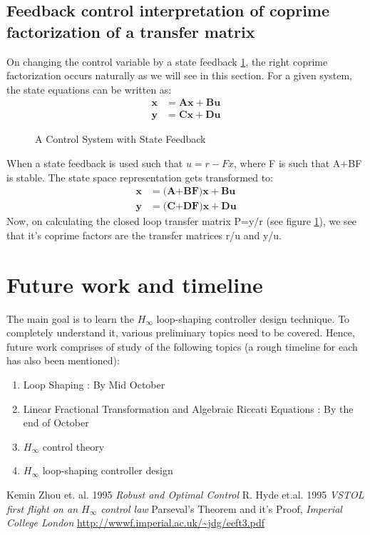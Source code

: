 \documentclass[a4paper,12pt]{article}
\begin{document}
		\subsection{Feedback control interpretation of coprime factorization of a transfer matrix}On changing the control variable by a state feedback \ref{sf}, the right coprime factorization occurs naturally as we will see in this section. For a given system, the state equations can be written as:
		\begin{align}
		\textbf{\.x}&=\textbf{Ax} + \textbf{Bu}\\
		\textbf{y}&=\textbf{Cx} + \textbf{Du}
		\end{align}
		\begin{figure}[H]
 
			  \centering
			  
%			  
			  \def\svgscale{1.8}
			  \tiny{
			  
			  }
			  \caption{A Control System with State Feedback}
			 \label{sf}
		\end{figure}
		When a state feedback is used such that $u=r-Fx$, where F is such that A+BF is stable. The state space representation gets transformed to:
		\begin{align}
		\textbf{\.x}&=\textbf{(A+BF)x} + \textbf{Bu}\\
		\textbf{y}&=\textbf{(C+DF)x} + \textbf{Du}
		\end{align}		
		Now, on calculating the closed loop transfer matrix P=y/r (see figure \ref{sf}), we see that it's coprime factors are the transfer matrices r/u and y/u.
		\section{Future work and timeline}
	The main goal is to learn the $H_{\infty}$ loop-shaping controller design technique. To completely understand it, various preliminary topics need to be covered. Hence, future work comprises of study of the following topics (a rough timeline for each has also been mentioned):
		\begin{enumerate}
			\item Loop Shaping : By Mid October
			\item Linear Fractional Transformation and Algebraic Riccati Equations : By the end of October
			\item $H_{\infty}$ control theory
			\item $H_{\infty}$ loop-shaping controller design 
		\end{enumerate}
\begin{thebibliography}{20}

 Kemin Zhou et. al. 1995 \emph{Robust and Optimal Control}
 R. Hyde et.al. 1995 \emph{VSTOL first flight on an $H_{\infty}$ control law}
 Parseval's Theorem and it's Proof, \emph{Imperial College London} \url{http://wwwf.imperial.ac.uk/~jdg/eeft3.pdf}
\end{thebibliography}
\end{document}
